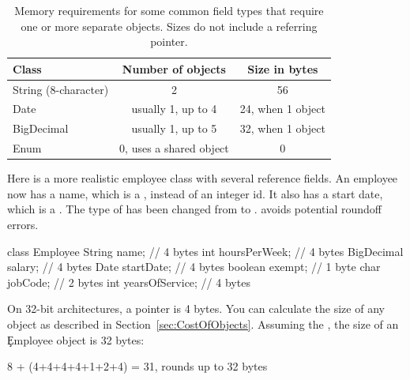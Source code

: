 \begin{table}[htbp]
  \centering
\begin{tabular}{lcc} \toprule
	Class & Number of objects & Size in bytes \\ \midrule
	String (8-character) & 2 & 56 \\
	Date & usually 1, up to 4 & 24, when 1 object \\
	BigDecimal & usually 1, up to 5 & 32, when 1 object \\
	Enum & 0, uses a shared object & 0 \\
	\bottomrule
\end{tabular}
  \caption{Memory requirements for some common field types that require one
  or more separate objects. Sizes do not include a referring pointer.
  }
  \label{tab:common-delegated-field-types}
\end{table}


Here is a more realistic employee class with several reference fields. An
employee now has a name, which is a , instead of an integer id. It
also has a start date, which is a . The type of  has
been changed from  to .  avoids potential roundoff errors.
\begin{shortlisting} 
class Employee {
    String name;                // 4 bytes
    int hoursPerWeek;           // 4 bytes
    BigDecimal salary;          // 4 bytes
    Date startDate;             // 4 bytes
    boolean exempt;             // 1 byte
    char jobCode;               // 2 bytes
    int yearsOfService;         // 4 bytes
}
\end{shortlisting}

On 32-bit architectures, a pointer is 4 bytes. 
You can calculate the size of any object as described in
Section~\ref{sec:CostOfObjects}.
Assuming the \oracle \jre, the size of an \c{Employee} object is 32 bytes:
\begin{shortlisting}
8 + (4+4+4+4+1+2+4) = 31, rounds up to 32 bytes
\end{shortlisting}

